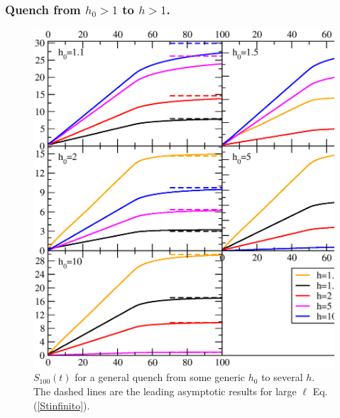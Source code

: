 \documentclass[12pt,preprint,tighten,eqsecnum,aps,floats,psfig,epsfig,amsmath,onecolumn]{revtex4-1}
\begin{document}
\subsubsection{Quench from $h_0>1$ to $h>1$.}

\begin{figure}[t]
\centerline{\includegraphics[width=15cm]{tutto100.eps}}
\caption{$S_{100}(t)$ for a general quench from some generic $h_0$ to several 
$h$.
The dashed lines are the leading asymptotic results for large $\ell$ 
Eq. (\ref{Stinfinito}).}
\label{SLhho}
\end{figure}
\end{document}
